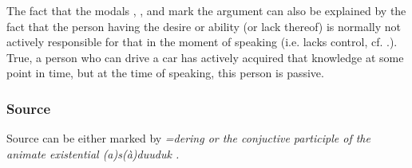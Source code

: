 %
%
%
%
%
%




%

The fact that the modals , ,  and  mark the argument can also be explained by the fact that the person having the desire or ability (or lack thereof) is normally not actively responsible for that in the moment of speaking (i.e. lacks control, cf. \citet{Ansaldo2005ms}.).  True, a person who can drive a car has actively acquired that knowledge at some point in time, but at the time of speaking, this person is passive.

%
%
%
%


\subsubsection{Source}\label{sec:func:Source}
Source can be either marked by \em =dering \em {}  or the conjuctive participle of the animate existential \em (a)s(à)duuduk \em {}  .





